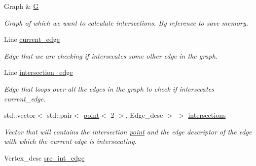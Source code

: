 \begin{DoxyCompactItemize}
\item 
\hypertarget{classintersector__Formaggia_a9778cc4e5159c4ac6899cd08f99179cf}{
Graph \& \hyperlink{classintersector__Formaggia_a9778cc4e5159c4ac6899cd08f99179cf}{G}}
\label{classintersector__Formaggia_a9778cc4e5159c4ac6899cd08f99179cf}

\begin{DoxyCompactList}\small\item\em Graph of which we want to calculate intersections. By reference to save memory. \item\end{DoxyCompactList}\item 
\hypertarget{classintersector__Formaggia_a70b8b12b13c990c7bf994eefb31aaf47}{
Line \hyperlink{classintersector__Formaggia_a70b8b12b13c990c7bf994eefb31aaf47}{current\_\-edge}}
\label{classintersector__Formaggia_a70b8b12b13c990c7bf994eefb31aaf47}

\begin{DoxyCompactList}\small\item\em Edge that we are checking if intersecates some other edge in the graph. \item\end{DoxyCompactList}\item 
\hypertarget{classintersector__Formaggia_a21902e2e9a7a930ee3ed279f5e8d4e0e}{
Line \hyperlink{classintersector__Formaggia_a21902e2e9a7a930ee3ed279f5e8d4e0e}{intersection\_\-edge}}
\label{classintersector__Formaggia_a21902e2e9a7a930ee3ed279f5e8d4e0e}

\begin{DoxyCompactList}\small\item\em Edge that loops over all the edges in the graph to check if intersecates current\_\-edge. \item\end{DoxyCompactList}\item 
\hypertarget{classintersector__Formaggia_a33aa80545c231f00e716f36174438225}{
std::vector$<$ std::pair$<$ \hyperlink{classpoint}{point}$<$ 2 $>$, Edge\_\-desc $>$ $>$ \hyperlink{classintersector__Formaggia_a33aa80545c231f00e716f36174438225}{intersections}}
\label{classintersector__Formaggia_a33aa80545c231f00e716f36174438225}

\begin{DoxyCompactList}\small\item\em Vector that will contains the intersection \hyperlink{classpoint}{point} and the edge descriptor of the edge with which the current edge is intersecating. \item\end{DoxyCompactList}\item 
\hypertarget{classintersector__Formaggia_a2ef28537b15c57ec55b0eb4967cdf4bf}{
Vertex\_\-desc \hyperlink{classintersector__Formaggia_a2ef28537b15c57ec55b0eb4967cdf4bf}{src\_\-int\_\-edge}}
\label{classintersector__Formaggia_a2ef28537b15c57ec55b0eb4967cdf4bf}


\end{DoxyCompactItemize}

